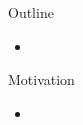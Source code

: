 \documentclass[aspectratio=169]{beamer}
\begin{document}
  \maketitle

  \begin{frame}{Outline}
    \begin{itemize}
      \item
    \end{itemize}
  \end{frame}

  \begin{frame}{Motivation}
    \begin{itemize}
      \item
    \end{itemize}
  \end{frame}
\end{document}
